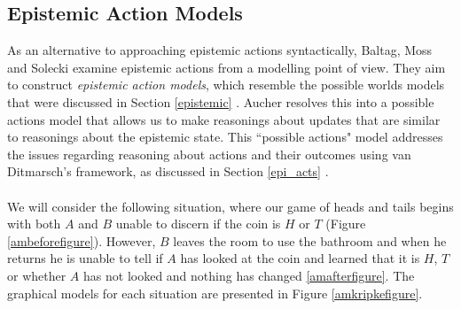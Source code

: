 \documentclass[12pt, a4paper, titlepage]{scrartcl}
\begin{document}
\subsection{Epistemic Action Models} \label{act_mods}
As an alternative to approaching epistemic actions syntactically, Baltag, Moss
and Solecki examine epistemic actions from a modelling point of view.
They aim to construct {\em epistemic action models}, which resemble the possible 
worlds models that were discussed in Section \ref{epistemic}
\cite{baltag1998lpa}.
Aucher resolves this into a possible actions model that allows us to make
reasonings about updates that are similar to reasonings about the epistemic
state\cite{aucher09revisited}.
This ``possible actions" model addresses the issues regarding reasoning about
actions and their outcomes using van Ditmarsch's framework, as discussed in
Section \ref{epi_acts} \cite{hoek2008dynamic}.\\
\\
We will consider the following situation, where our game of heads and tails
begins with both $A$ and $B$ unable to discern if the coin is $H$ or $T$ (Figure
\ref{ambeforefigure}).
However, $B$ leaves the room to use the bathroom and when he returns he is unable
to tell if $A$ has looked at the coin and learned that it is $H$, $T$ or whether
$A$ has not looked and nothing has changed \ref{amafterfigure}.
The graphical models for each situation are presented in Figure
\ref{amkripkefigure}.\\
\end{document}

